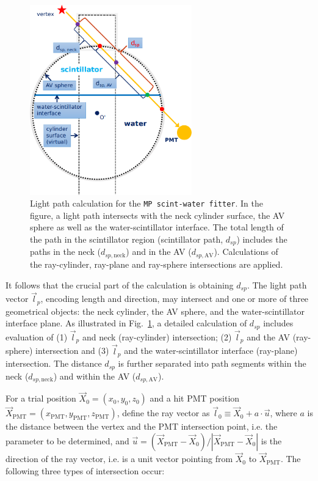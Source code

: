 \begin{figure}[!htb]
	\centering
	\includegraphics[width=7cm]{scintpath.png}
	\caption[Light path calculation for the \texttt{MP scint-water fitter}.]{Light path calculation for the \texttt{MP scint-water fitter}. In the figure, a light path intersects with the neck cylinder surface, the AV sphere as well as the water-scintillator interface. The total length of the path in the scintillator region (scintillator path, $d_{sp}$) includes the paths in the neck ($d_{sp,\mathrm{neck}}$) and in the AV ($d_{sp,\mathrm{AV}}$). Calculations of the ray-cylinder, ray-plane and ray-sphere intersections are applied.	\label{fig:scintpath}}
\end{figure}

It follows that the crucial part of the calculation is obtaining $d_{sp}$. The light path vector $\vec{l}_p$, encoding length and direction, may intersect and one or more of three geometrical objects: the neck cylinder, the AV sphere, and the water-scintillator interface plane. As illustrated in Fig.~\ref{fig:scintpath}, a detailed calculation of $d_{sp}$ includes evaluation of (1) $\vec{l}_p$ and neck (ray-cylinder) intersection; (2) $\vec{l}_p$ and the AV (ray-sphere) intersection and (3) $\vec{l}_p$ and the water-scintillator interface (ray-plane) intersection. The distance $d_{sp}$ is further separated into path segments within the neck ($d_{sp,\mathrm{neck}}$) and within the AV ($d_{sp,\mathrm{AV}}$). 

For a trial position $\vec{X}_0=(x_0,y_0,z_0)$ and a hit PMT position $\vec{X}_{\mathrm{PMT}}=(x_\mathrm{PMT},y_\mathrm{PMT},z_\mathrm{PMT})$, define the ray vector as $\vec{l}_0\equiv\vec{X}_0+a\cdot \vec{u}$, where $a$ is the distance between the vertex and the PMT intersection point, i.e. the parameter to be determined, and $\vec u=(\vec{X}_{\mathrm{PMT}}-\vec{X}_0 ) / |\vec{X}_{\mathrm{PMT}}-\vec{X}_0|$ is the direction of the ray vector, i.e. is a unit vector pointing from $\vec{X}_0$ to $\vec{X}_{\mathrm{PMT}}$. The following three types of intersection occur:

